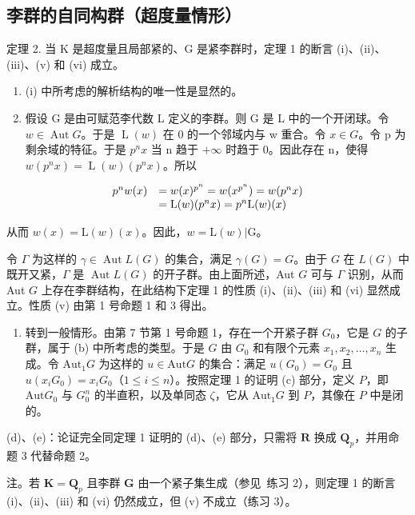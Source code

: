 \subsection{李群的自同构群（超度量情形）}

定理 2. 当 K 是超度量且局部紧的、G 是紧李群时，定理 1 的断言 (i)、(ii)、(iii)、(v) 和 (vi) 成立。

\begin{enumerate}
\def\labelenumi{(\alph{enumi})}
\item
  (i) 中所考虑的解析结构的唯一性是显然的。
\item
  假设 G 是由可赋范李代数 L 定义的李群。则 G 是 L 中的一个开闭球。令 \(w \in \operatorname{Aut} G\)。于是 \(\operatorname{L}(w)\) 在 0 的一个邻域内与 w 重合。令 \(x \in G\)。令 p 为剩余域的特征。于是 \(p^{n}x\) 当 n 趋于 \(+\infty\) 时趋于 0。因此存在 n，使得 \(w(p^{n}x) = \operatorname{L}(w)(p^{n}x)\)。所以
\end{enumerate}

\[
\begin{array}{r l} p ^ {n} w (x) & = w (x) ^ {p ^ {n}} = w (x ^ {p ^ {n}}) = w (p ^ {n} x) \\ & = \mathrm{L} (w) (p ^ {n} x) = p ^ {n} \mathrm{L} (w) (x) \end{array}
\]

从而 \(w(x) = \mathrm{L}(w)(x)\)。因此，\(w = \mathrm{L}(w)|\mathrm{G}\)。

令 \(\Gamma\) 为这样的 \(\gamma \in \operatorname{Aut} L(G)\) 的集合，满足 \(\gamma(G) = G\)。由于 \(G\) 在 \(L(G)\) 中既开又紧，\(\Gamma\) 是 \(\operatorname{Aut} L(G)\) 的开子群。由上面所述，Aut \(G\) 可与 \(\Gamma\) 识别，从而 Aut \(G\) 上存在李群结构，在此结构下定理 1 的性质 (i)、(ii)、(iii) 和 (vi) 显然成立。性质 (v) 由第 1 号命题 1 和 3 得出。

\begin{enumerate}
\def\labelenumi{(\alph{enumi})}
\setcounter{enumi}{2}
\tightlist
\item
  转到一般情形。由第 7 节第 1 号命题 1，存在一个开紧子群 \(G_0\)，它是 \(G\) 的子群，属于 (b) 中所考虑的类型。于是 \(G\) 由 \(G_0\) 和有限个元素 \(x_1, x_2, \ldots, x_n\) 生成。令 \(\text{Aut}_1G\) 为这样的 \(u \in \text{Aut}G\) 的集合：满足 \(u(G_0) = G_0\) 且 \(u(x_iG_0) = x_iG_0\)（\(1 \leqslant i \leqslant n\)）。按照定理 1 的证明 (c) 部分，定义 \(P\)，即 \(\text{Aut}G_0\) 与 \(G_0^n\) 的半直积，以及单同态 \(\zeta\)，它从 \(\text{Aut}_1G\) 到 \(P\)，其像在 \(P\) 中是闭的。
\end{enumerate}

(d)、(e)：论证完全同定理 1 证明的 (d)、(e) 部分，只需将 \(\mathbf{R}\) 换成 \(\mathbf{Q}_p\)，并用命题 3 代替命题 2。

注。若 \(\mathbf{K} = \mathbf{Q}_p\) 且李群 \(\mathbf{G}\) 由一个紧子集生成（参见~练习 2），则定理 1 的断言 (i)、(ii)、(iii) 和 (vi) 仍然成立，但 (v) 不成立（练习 3）。

